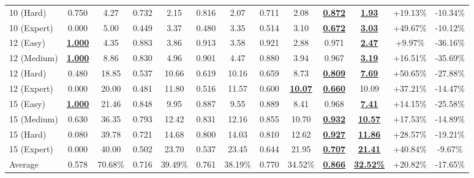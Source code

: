 \documentclass[letterpaper, 10pt, journal, twoside]{IEEEtran}
\begin{document}
\begin{table}[thpb]
\begin{tabular}{l c c c c c c c c c c c c}
        10 (Hard) & 0.750 & 4.27 & 0.732 & 2.15 & 0.816 & 2.07 & 0.711 & 2.08 & \underline{\textbf{0.872}} & \underline{\textbf{1.93}} & +19.13\% & -10.34\% \\
        10 (Expert) & 0.000 & 5.00 & 0.449 & 3.37 & 0.480 & 3.35 & 0.514 & 3.10 & \underline{\textbf{0.672}} & \underline{\textbf{3.03}} & +49.67\% & -10.12\% \\
        \midrule
        12 (Easy) & \underline{\textbf{1.000}} & 4.35 & 0.883 & 3.86 & 0.913 & 3.58 & 0.921 & 2.88 & 0.971 & \underline{\textbf{2.47}} & +9.97\% & -36.16\% \\
        12 (Medium) & \underline{\textbf{1.000}} & 8.86 & 0.830 & 4.96 & 0.901 & 4.47 & 0.880 & 3.94 & 0.967 & \underline{\textbf{3.19}} & +16.51\% & -35.69\% \\
        12 (Hard) & 0.480 & 18.85 & 0.537 & 10.66 & 0.619 & 10.16 & 0.659 & 8.73 & \underline{\textbf{0.809}} & \underline{\textbf{7.69}} & +50.65\% & -27.88\% \\
        12 (Expert) & 0.000 & 20.00 & 0.481 & 11.80 & 0.516 & 11.57 & 0.600 & \underline{\textbf{10.07}} & \underline{\textbf{0.660}} & 10.09 & +37.21\% & -14.47\% \\
        \midrule
        15 (Easy) & \underline{\textbf{1.000}} & 21.46 & 0.848 & 9.95 & 0.887 & 9.55 & 0.889 & 8.41 & 0.968 & \underline{\textbf{7.41}} & +14.15\% & -25.58\% \\
        15 (Medium) & 0.630 & 36.35 & 0.793 & 12.42 & 0.831 & 12.16 & 0.855 & 10.70 & \underline{\textbf{0.932}} & \underline{\textbf{10.57}} & +17.53\% & -14.89\% \\
        15 (Hard) & 0.080 & 39.78 & 0.721 & 14.68 & 0.800 & 14.03 & 0.810 & 12.62 & \underline{\textbf{0.927}} & \underline{\textbf{11.86}} & +28.57\% & -19.21\% \\
        15 (Expert) & 0.000 & 40.00 & 0.502 & 23.70 & 0.537 & 23.45 & 0.644 & 21.95 & \underline{\textbf{0.707}} & \underline{\textbf{21.41}} & +40.84\% & -9.67\% \\
        \midrule
        Average & 0.578 & 70.68\% & 0.716 & 39.49\%	 & 0.761 & 38.19\% & 0.770 & 34.52\% & \underline{\textbf{0.866}} & \underline{\textbf{32.52\%}} & +20.82\% & -17.65\% \\
        \bottomrule
    \end{tabular}
    \vspace{-10pt}
\end{table}
\end{document}
